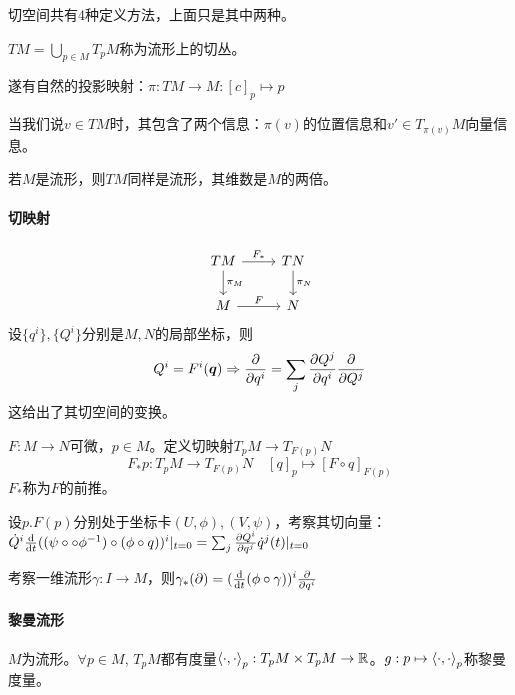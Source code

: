 \documentclass{ctexbook}
\begin{document}
\begin{Rmk}
切空间共有4种定义方法，上面只是其中两种。
\end{Rmk}

\begin{Def}
  $TM=\bigcup_{p\in M}T_{p}M$称为流形上的切丛。
\end{Def}

遂有自然的投影映射：$\pi: TM\to M: [c]_{p}\mapsto p$

当我们说$v\in TM$时，其包含了两个信息：$\pi(v)$的位置信息和$v'\in T_{\pi(v)}M$向量信息。

若$M$是流形，则$TM$同样是流形，其维数是$M$的两倍。

\paragraph{切映射}
\[
\begin{tikzcd}
TM \arrow[d, "\pi_M"] \arrow[r, "F_{*}"] & TN \arrow[d, "\pi_N"] \\
M \arrow[r, "F"]                     & N                    
\end{tikzcd}
\]
设$\{q^{i}\},\{Q^{i}\}$分别是$M,N$的局部坐标，则
\[Q^{i}=F^{i}(\bm q)\Rightarrow \frac{\partial }{\partial q^{i}}=\sum_{j}\frac{\partial Q^{j}}{\partial q^{i}}\frac{\partial }{\partial Q^{j}}\]
这给出了其切空间的变换。

\begin{Def}[切映射]
  $F:M\to N$可微，$p\in M$。定义切映射$T_{p}M\to T_{F(p)}N$
  \[F_{*}p:T_{p}M\to T_{F(p)}N\quad [q]_{p}\mapsto [F\circ q]_{F(p)}\]
  $F_{*}$称为$F$的前推。
\end{Def}

设$p.F(p)$分别处于坐标卡$(U,\phi),(V,\psi)$，考察其切向量：$\dot Q^{i}\frac{\mathrm{d}}{\mathrm{d}t}((\psi\circ \circ \phi^{-1})\circ(\phi\circ q))^{i}|_{t=0}=\sum_{j}\frac{\partial Q^{i}}{\partial q^{j}}\dot{q}^{j}(t)|_{t=0}$

\begin{Eg}
  考察一维流形$\gamma: I\to M$，则$\gamma_{*}(\partial)=(\frac{\mathrm{d}}{\mathrm{d}t}(\phi\circ \gamma))^{i}\frac{\partial }{\partial q^{i}}$
\end{Eg}

\paragraph{黎曼流形}
\begin{Def}[黎曼流形]
  $M$为流形。$\forall p\in M$, $T_{p}M$都有度量$\left<\cdot,\cdot\right>_{p}:T_{p}M\times T_{p}M\to\mathbb{R}$。$g:p\mapsto \left<\cdot,\cdot\right>_{p}$称黎曼度量。
\end{Def}
\end{document}
